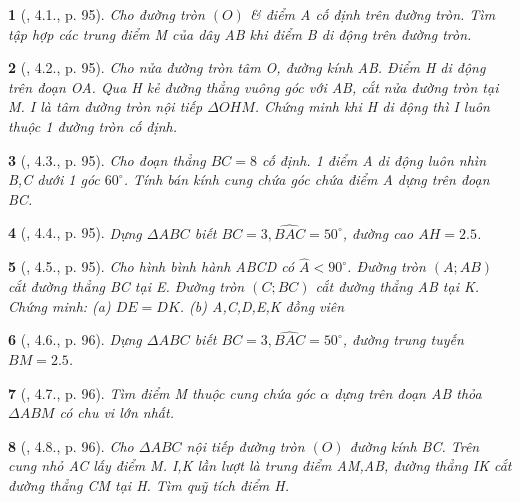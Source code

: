\documentclass{article}
\newtheorem{baitoan}{}
\begin{document}
\begin{baitoan}[\cite{Binh_boi_duong_Toan_9_tap_2}, 4.1., p. 95]
	Cho đường tròn $(O)$ \& điểm A cố định trên đường tròn. Tìm tập hợp các trung điểm M của dây AB khi điểm B di động trên đường tròn.
\end{baitoan}

\begin{baitoan}[\cite{Binh_boi_duong_Toan_9_tap_2}, 4.2., p. 95]
	Cho nửa đường tròn tâm O, đường kính AB. Điểm H di động trên đoạn OA. Qua H kẻ đường thẳng vuông góc với AB, cắt nửa đường tròn tại M. I là tâm đường tròn nội tiếp $\Delta OHM$. Chứng minh khi H di động thì I luôn thuộc 1 đường tròn cố định.
\end{baitoan}

\begin{baitoan}[\cite{Binh_boi_duong_Toan_9_tap_2}, 4.3., p. 95]
	Cho đoạn thẳng $BC = 8$ cố định. 1 điểm A di động luôn nhìn B,C dưới 1 góc $60^\circ$. Tính bán kính cung chứa góc chứa điểm A dựng trên đoạn BC.
\end{baitoan}

\begin{baitoan}[\cite{Binh_boi_duong_Toan_9_tap_2}, 4.4., p. 95]
	Dựng $\Delta ABC$ biết $BC = 3,\widehat{BAC} = 50^\circ$, đường cao $AH = 2.5$.
\end{baitoan}

\begin{baitoan}[\cite{Binh_boi_duong_Toan_9_tap_2}, 4.5., p. 95]
	Cho hình bình hành ABCD có $\widehat{A} < 90^\circ$. Đường tròn $(A;AB)$ cắt đường thẳng BC tại E. Đường tròn $(C;BC)$ cắt đường thẳng AB tại K. Chứng minh: (a) $DE = DK$. (b) A,C,D,E,K đồng viên
\end{baitoan}

\begin{baitoan}[\cite{Binh_boi_duong_Toan_9_tap_2}, 4.6., p. 96]
	Dựng $\Delta ABC$ biết $BC = 3,\widehat{BAC} = 50^\circ$, đường trung tuyến $BM = 2.5$.
\end{baitoan}

\begin{baitoan}[\cite{Binh_boi_duong_Toan_9_tap_2}, 4.7., p. 96]
	Tìm điểm M thuộc cung chứa góc $\alpha$ dựng trên đoạn AB thỏa $\Delta ABM$ có chu vi lớn nhất.
\end{baitoan}

\begin{baitoan}[\cite{Binh_boi_duong_Toan_9_tap_2}, 4.8., p. 96]
	Cho $\Delta ABC$ nội tiếp đường tròn $(O)$ đường kính BC. Trên cung nhỏ AC lấy điểm M. I,K lần lượt là trung điểm AM,AB, đường thẳng IK cắt đường thẳng CM tại H. Tìm quỹ tích điểm H.
\end{baitoan}
\end{document}
